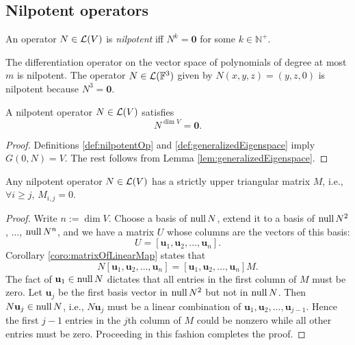 \subsection{Nilpotent operators}
\label{sec:nilpotent-operators}

\begin{defn}
  \label{def:nilpotentOp}
  An operator $N\in{\cal L}(V)$
  is \emph{nilpotent} iff $N^k=\mathbf{0}$
  for some $k\in \mathbb{N}^+$.
\end{defn}

\begin{exm}
  The differentiation operator
  on the vector space of polynomials
  of degree at most $m$
  is nilpotent.
  The operator $N\in{\cal L}(\mathbb{F}^3)$
  given by $N(x,y,z)=(y,z,0)$
  is nilpotent because $N^3=\mathbf{0}$.
\end{exm}

\begin{lem}
  \label{lem:nilpotentOpHighestPower}
  A nilpotent operator $N\in {\cal L}(V)$
  satisfies
  \begin{equation}
    \label{eq:nilpotentOpHighestPower}
    N^{\dim V}=\mathbf{0}.
  \end{equation}
\end{lem}
\begin{proof}
  Definitions \ref{def:nilpotentOp} and
  \ref{def:generalizedEigenspace} imply
  $G(0, N)=V$.
  The rest follows from Lemma \ref{lem:generalizedEigenspace}.
\end{proof}

\begin{lem}
  \label{lem:matrixOfNilpotentOperators}
  Any nilpotent operator $N\in {\cal L}(V)$
  has a strictly upper triangular matrix $M$, 
  i.e., $\forall i\ge j$, $M_{i,j}=0$.
\end{lem}
\begin{proof}
  Write $n:=\dim V$.
  Choose a basis of $\mathrm{null}\, N$,
  extend it to a basis of $\mathrm{null}\, N^2$,
  $\ldots$, $\mathrm{null}\, N^n$,
  and we have a matrix $U$ whose columns
  are the vectors of this basis:
  \begin{displaymath}
    U = [\mathbf{u}_1, \mathbf{u}_2, \ldots, \mathbf{u}_n].
  \end{displaymath}
  Corollary \ref{coro:matrixOfLinearMap} states that
  \begin{displaymath}
    N [\mathbf{u}_1, \mathbf{u}_2, \ldots, \mathbf{u}_n]
    = [\mathbf{u}_1, \mathbf{u}_2, \ldots, \mathbf{u}_n] M.
  \end{displaymath}
  The fact of $\mathbf{u}_1\in \mathrm{null}\,N$ dictates
  that all entries in the first column of $M$ must be zero.
  Let $\mathbf{u}_j$ be the first basis vector in $\mathrm{null}\,N^2$
  but not in $\mathrm{null}\,N$.
  Then $N \mathbf{u}_j\in \mathrm{null}\,N$, i.e., 
  $N \mathbf{u}_j$ must be a linear combination
  of $\mathbf{u}_1, \mathbf{u}_2, \ldots, \mathbf{u}_{j-1}$.
  Hence the first $j-1$ entries in the $j$th column of $M$
  could be nonzero while all other entries must be zero.
  Proceeding in this fashion completes the proof.
\end{proof}


